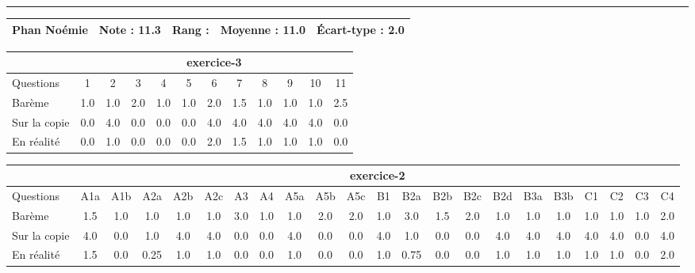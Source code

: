 \documentclass[a4paper, landscape, 10pt]{article}
\begin{document}
\begin{minipage}{\textwidth}
  \end{minipage}
  \vspace{0.3cm}
  \hrule
  \vspace{0.3cm}

  \begin{minipage}{\textwidth}
    { \bf
    \begin{tabular}{|c|*{4}{c|}}
    \hline
      Phan Noémie & Note : 11.3 & Rang :  & Moyenne : 11.0 & \'Ecart-type : 2.0 \\
    \hline
    \end{tabular}
    }
    
      \begin{tabular}{|l|*{ 11 }{c|}}
        \hline
        & \multicolumn{ 11 }{c|}{ exercice-3 } \\
        \hline
        Questions & 1&2&3&4&5&6&7&8&9&10&11 \\
        \hline
        Barème & 1.0&1.0&2.0&1.0&1.0&2.0&1.5&1.0&1.0&1.0&2.5 \\
        \hline
        Sur la copie & 0.0&4.0&0.0&0.0&0.0&4.0&4.0&4.0&4.0&4.0&0.0 \\
        \hline
        En réalité & 0.0&1.0&0.0&0.0&0.0&2.0&1.5&1.0&1.0&1.0&0.0 \\
        \hline
      \end{tabular}
    
      \begin{tabular}{|l|*{ 21 }{c|}}
        \hline
        & \multicolumn{ 21 }{c|}{ exercice-2 } \\
        \hline
        Questions & A1a&A1b&A2a&A2b&A2c&A3&A4&A5a&A5b&A5c&B1&B2a&B2b&B2c&B2d&B3a&B3b&C1&C2&C3&C4 \\
        \hline
        Barème & 1.5&1.0&1.0&1.0&1.0&3.0&1.0&1.0&2.0&2.0&1.0&3.0&1.5&2.0&1.0&1.0&1.0&1.0&1.0&1.0&2.0 \\
        \hline
        Sur la copie & 4.0&0.0&1.0&4.0&4.0&0.0&0.0&4.0&0.0&0.0&4.0&1.0&0.0&0.0&4.0&4.0&4.0&4.0&4.0&0.0&4.0 \\
        \hline
        En réalité & 1.5&0.0&0.25&1.0&1.0&0.0&0.0&1.0&0.0&0.0&1.0&0.75&0.0&0.0&1.0&1.0&1.0&1.0&1.0&0.0&2.0 \\
        \hline
      \end{tabular}
    

\end{minipage}
\end{document}
